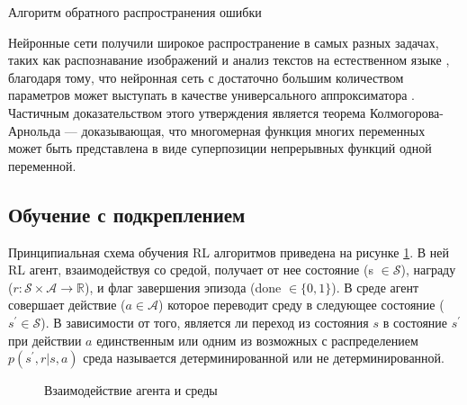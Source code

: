 \begin{algorithm}[ht]
	\SetAlgoLined
	\caption{Алгоритм обратного распространения ошибки}
	\label{alg:backprop}

\end{algorithm}

Нейронные сети получили широкое распространение в самых разных задачах, таких как распознавание изображений \cite{alexnet} и анализ текстов на естественном языке \cite{bert}, благодаря тому, что нейронная сеть с достаточно большим количеством параметров может выступать в качестве универсального аппроксиматора \cite{Hornik1989}. Частичным доказательством этого утверждения является теорема Колмогорова-Арнольда\cite{kolmogorov, arnold} --- доказывающая, что многомерная функция многих переменных может быть представлена в виде суперпозиции непрерывных функций одной переменной. 

\subsection{Обучение с подкреплением}

Принципиальная схема обучения RL алгоритмов приведена на рисунке \ref{fig:rl}. В ней RL агент, взаимодействуя со средой, получает от нее состояние (s $\in \mathcal{S}$), награду ($r: \mathcal{S} \times \mathcal{A} \to \mathbb{R}$), и флаг завершения эпизода (done $\in \{0, 1\}$).  В среде агент совершает действие ($a \in \mathcal{A}$) которое переводит среду в следующее состояние ($s^{\prime} \in \mathcal{S}$). В зависимости от того, является ли переход из состояния $s$ в состояние $s^{\prime}$ при действии $a$ единственным или одним из возможных с распределением $p(s^{\prime},r|s,a)$ среда называется детерминированной или не детерминированной. 

\begin{figure}[ht]
	\caption{Взаимодействие агента и среды}
	\label{fig:rl}
\end{figure}

